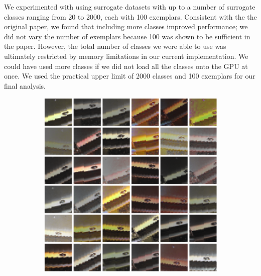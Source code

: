 \documentclass{article} %
\begin{document}
We experimented with using surrogate datasets with up to a number of surrogate classes ranging from 20 to 2000, each with 100 exemplars. Consistent with the the original paper, we found that including more classes improved performance; we did not vary the number of exemplars because 100 was shown to be sufficient in the paper. However, the total number of classes we were able to use was ultimately restricted by memory limitations in our current implementation. We could have used more classes if we did not load all the classes onto the GPU at once. We used the practical upper limit of 2000 classes and 100 exemplars for our final analysis. 

\begin{figure}[h]
\centering
\begin{subfigure}{0.2\textwidth}
  \centering
  \includegraphics[width=\textwidth]{figs/patch_noflip_lines.png}
\end{subfigure}
\begin{subfigure}{0.2\textwidth}
  \centering

\end{subfigure}
\end{figure}
\end{document}
